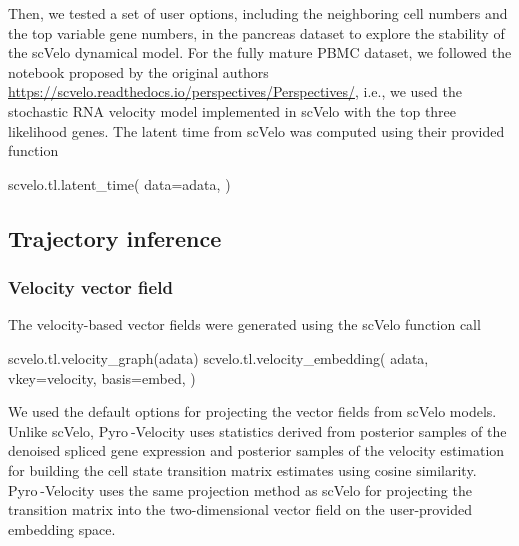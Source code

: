 \documentclass[
  sn-mathphys-num,
  lineno,
  twocolumn]{sn-jnl}
\newenvironment{Shaded}{\begin{snugshade}}{\end{snugshade}}
\newcommand{\NormalTok}[1]{\textcolor[rgb]{0.00,0.23,0.31}{#1}}
\newcommand{\OperatorTok}[1]{\textcolor[rgb]{0.37,0.37,0.37}{#1}}
\newcommand{\StringTok}[1]{\textcolor[rgb]{0.13,0.47,0.30}{#1}}
\begin{document}
Then, we tested a set of user options, including the neighboring cell
numbers and the top variable gene numbers, in the pancreas dataset to
explore the stability of the scVelo dynamical model. For the fully
mature PBMC dataset, we followed the notebook proposed by the original
authors \url{https://scvelo.readthedocs.io/perspectives/Perspectives/},
i.e., we used the stochastic RNA velocity model implemented in scVelo
with the top three likelihood genes. The latent time from scVelo was
computed using their provided function

\begin{Shaded}
\begin{Highlighting}[]
\NormalTok{scvelo.tl.latent\_time(}
\NormalTok{  data}\OperatorTok{=}\NormalTok{adata,}
\NormalTok{)}
\end{Highlighting}
\end{Shaded}

\subsection{Trajectory
inference}\label{sec-methods-trajectory-inference}

\subsubsection{Velocity vector field}\label{velocity-vector-field}

The velocity-based vector fields were generated using the scVelo
function call

\begin{Shaded}
\begin{Highlighting}[]
\NormalTok{scvelo.tl.velocity\_graph(adata)}
\NormalTok{scvelo.tl.velocity\_embedding(}
\NormalTok{  adata, }
\NormalTok{  vkey}\OperatorTok{=}\StringTok{\textquotesingle{}velocity\textquotesingle{}}\NormalTok{,}
\NormalTok{  basis}\OperatorTok{=}\StringTok{\textquotesingle{}embed\textquotesingle{}}\NormalTok{,}
\NormalTok{)}
\end{Highlighting}
\end{Shaded}

We used the default options for projecting the vector fields from scVelo
models. Unlike scVelo, Pyro -Velocity uses statistics derived from
posterior samples of the denoised spliced gene expression and posterior
samples of the velocity estimation for building the cell state
transition matrix estimates using cosine similarity. Pyro -Velocity uses
the same projection method as scVelo for projecting the transition
matrix into the two-dimensional vector field on the user-provided
embedding space.
\end{document}
